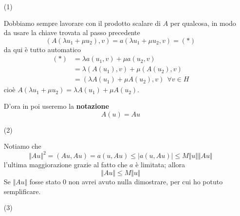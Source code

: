 \begin{dimostrazione}
\begin{itemize}
        \item[(1)]

              Dobbiamo sempre lavorare con il prodotto scalare di $A$ per qualcosa, in modo da usare la chiave trovata al passo precedente
              \begin{equation*}
                  (A(\lambda u_{1} +\mu u_{2}),v) =a(\lambda u_{1} +\mu u_{2},v) =(*)
              \end{equation*}
              da qui è tutto automatico
              \begin{align*}
                  (*) & =\lambda a(u_{1},v) +\mu a(u_{2},v)                    \\
                      & =\lambda (A(u_{1}),v) +\mu (A(u_{2}),v)                \\
                      & =(\lambda A(u_{1}) +\mu A(u_{2}),v) \ \ \forall v\in H
              \end{align*}
              cioè $A(\lambda u_{1} +\mu u_{2}) =\lambda A(u_{1}) +\mu A(u_{2})$.

              D'ora in poi useremo la \textbf{notazione}
              \begin{equation*}
                  A(u) =Au
              \end{equation*}

        \item[(2)]

              Notiamo che
              \begin{equation*}
                  \Vert Au\Vert ^{2} =(Au,Au) =a(u,Au) \leq | a(u,Au)| \leq M\Vert u\Vert \Vert Au\Vert
              \end{equation*}
              l'ultima maggiorazione grazie al fatto che $a$ è limitata; allora
              \begin{equation*}
                  \Vert Au\Vert \leq M\Vert u\Vert
              \end{equation*}
              Se $\Vert Au\Vert $ fosse stato $0$ non avrei avuto nulla dimostrare, per cui ho potuto semplificare.

        \item[(3)]


\end{itemize}
\end{dimostrazione}

